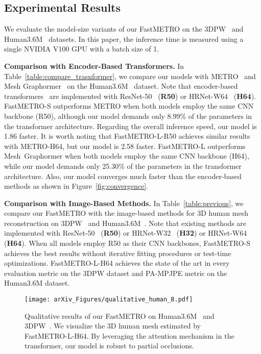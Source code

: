 \subsection{Experimental Results}
We evaluate the model-size variants of our FastMETRO on the 3DPW~\cite{marcard20183dpw} and Human3.6M~\cite{wang2014h36m} datasets.
In this paper, the inference time is measured using a single NVIDIA V100 GPU with a batch size of 1.

\noindent \textbf{Comparison with Encoder-Based Transformers.}
In Table~\ref{table:compare_trasnformer}, we compare our models with METRO~\cite{lin2021metro} and Mesh Graphormer~\cite{lin2021graphormer} on the Human3.6M~\cite{wang2014h36m} dataset.
Note that encoder-based transformers~\cite{lin2021metro,lin2021graphormer} are implemented with \mbox{ResNet-50}~\cite{resnet} (\textbf{R50}) or
\mbox{HRNet-W64}~\cite{wang2019hrnet} (\textbf{H64}).
\mbox{FastMETRO-S} outperforms METRO when both models employ the same CNN backbone (R50), 
although our model demands only 8.99\% of the parameters in the transformer architecture.
Regarding the \mbox{overall} inference speed, our model is 1.86 faster.
It is worth noting that 
\mbox{FastMETRO-L-R50} achieves similar results with \mbox{METRO-H64}, but our model is 2.58 faster. 
\mbox{FastMETRO-L} outperforms \mbox{Mesh Graphormer} 
when both models employ the same CNN backbone (H64), 
while our model demands only 25.30\% of the parameters in the transformer architecture.
Also, our model converges much faster than the encoder-based methods as shown in Figure~\ref{fig:convergence}.

\noindent \textbf{Comparison with Image-Based Methods.}
In Table~\ref{table:previous}, we compare our \mbox{FastMETRO} with the image-based methods for 3D human mesh reconstruction on 3DPW~\cite{marcard20183dpw} and Human3.6M~\cite{wang2014h36m}.
Note that existing methods are implemented with
\mbox{ResNet-50}~\cite{resnet} (\textbf{R50}) or
\mbox{HRNet-W32}~\cite{wang2019hrnet} (\textbf{H32}) or 
\mbox{HRNet-W64}~\cite{wang2019hrnet} (\textbf{H64}).
When all models employ R50 as their CNN backbones,
\mbox{FastMETRO-S} achieves the best results without 
iterative fitting procedures or test-time optimizations.
\mbox{FastMETRO-L-H64} achieves the state of the art in every evaluation metric on the 3DPW dataset and PA-MPJPE metric on the Human3.6M dataset.

\begin{figure}[t!]
    \centering
    \texttt{[image: arXiv\_Figures/qualitative\_human\_8.pdf]}
    \caption{
    Qualitative results of our FastMETRO on Human3.6M~\cite{wang2014h36m} and 3DPW~\cite{marcard20183dpw}. 
    We visualize the 3D human mesh estimated by FastMETRO-L-H64.
    By leveraging the attention mechanism in the transformer,
    our model is robust to partial occlusions.
    }
    \label{fig:qualitative_human}
\end{figure}


